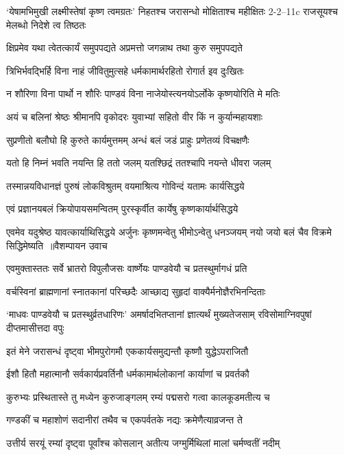 \threelineshloka
{`येषामभिमुखी लक्ष्मीस्तेषां कृष्ण त्वमग्रतः'}
{निहतश्च जरासन्धो मोक्षिताश्च महीक्षितः}
{2-2--11c राजसूयश्च मेलब्धो निदेशे त्व तिष्ठतः}


\threelineshloka
{क्षिप्रमेव यथा त्वेतत्कार्यं समुपपद्यते}
{अप्रमत्तो जगन्नाथ तथा कुरु समुपपद्यते}
{}


\twolineshloka
{त्रिभिर्भवद्भिर्हि विना नाहं जीवितुमुत्सहे}
{धर्मकामार्थरहितो रोगार्त इव दुःखितः}


\twolineshloka
{न शौरिणा विना पार्थो न शौरिः पाण्डवं विना}
{नाजेयोस्त्यनयोऽर्लोके कृष्णयोरिति मे मतिः}


\twolineshloka
{अयं च बलिनां श्रेष्ठः श्रीमानपि वृकोदरः}
{युवाभ्यां सहितो वीर किं न कुर्यान्महायशाः}


\twolineshloka
{सुप्रणीतो बलौघो हि कुरुते कार्यमुत्तमम्}
{अन्धं बलं जडं प्राहुः प्रणेतव्यं विचक्षणैः}


\twolineshloka
{यतो हि निम्नं भवति नयन्ति हि ततो जलम्}
{यतश्छिद्रं ततश्चापि नयन्ते धीवरा जलम्}


\twolineshloka
{तस्मान्नयविधानज्ञं पुरुषं लोकविश्रुतम्}
{वयमाश्रित्य गोविन्दं यतामः कार्यसिद्धये}


\twolineshloka
{एवं प्रज्ञानयबलं क्रियोपायसमन्वितम्}
{पुरस्कृर्वीत कार्येषु कृष्णकार्यार्थसिद्धये}


\fourlineindentedshloka
{एवमेव यदुश्रेष्ठ यावत्कार्याथिसिद्धये}
{अर्जुनः कृष्णमन्वेतु भीमोऽन्वेतु धनञ्जयम्}
{नयो जयो बलं चैव विक्रमे सिद्धिमेष्यति ॥वैशम्पायन उवाच}
{}


\twolineshloka
{एवमुक्तास्ततः सर्वे भ्रातरो विपुलौजसः}
{वार्ष्णेयः पाण्डवेयौ च प्रतस्थुर्मागधं प्रति}


\twolineshloka
{वर्चस्विनां ब्राह्मणानां स्नातकानां परिच्छदैः}
{आच्छाद्य सुहृदां वाक्यैर्मनोज्ञैरभिनन्दिताः}


\threelineshloka
{`माधवः पाण्डवेयौ च प्रतस्थुर्व्रतधारिणः'}
{अमर्षादभितप्तानां ज्ञात्यर्थं मुख्यतेजसाम्}
{रविसोमाग्निवपुषां दीप्तमासीत्तदा वपुः}


\twolineshloka
{इतं मेने जरासन्धं दृष्ट्वा भीमपुरोगमौ}
{एककार्यसमुद्यन्तौ कृष्णौ युद्धेऽपराजितौ}


\twolineshloka
{ईशौ हितौ महात्मानौ सर्वकार्यप्रवर्तिनौ}
{धर्मकामार्थलोकानां कार्याणां च प्रवर्तकौ}


\twolineshloka
{कुरुभ्यः प्रस्थितास्ते तु मध्येन कुरुजाङ्गलम्}
{रम्यं पद्मसरो गत्वा कालकूडमतीत्य च}


\twolineshloka
{गण्डकीं च महाशोणं सदानीरां तथैव च}
{एकपर्वतके नद्यः क्रमेणैत्याव्रजन्त ते}


\twolineshloka
{उत्तीर्य सरयूं रम्यां दृष्ट्वा पूर्वांश्च कोसलान्}
{अतीत्य जग्मुर्मिथिलां मालां चर्मण्वतीं नदीम्}


